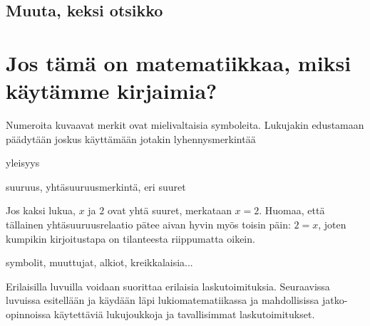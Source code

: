 \subsection*{Muuta, keksi otsikko}





\section{Jos tämä on matematiikkaa, miksi käytämme kirjaimia?}

Numeroita kuvaavat merkit ovat mielivaltaisia symboleita. Lukujakin edustamaan päädytään joskus käyttämään jotakin lyhennysmerkintää

yleisyys

suuruus, yhtäsuuruusmerkintä, eri suuret

Jos kaksi lukua, $x$ ja $2$ ovat yhtä suuret, merkataan
$x=2$. Huomaa, että tällainen yhtäsuuruusrelaatio pätee aivan hyvin myös toisin päin: $2=x$, joten kumpikin kirjoitustapa on tilanteesta riippumatta oikein.

symbolit, muuttujat, alkiot, kreikkalaisia...



Erilaisilla luvuilla voidaan suorittaa erilaisia laskutoimituksia. Seuraavissa luvuissa esitellään ja käydään läpi lukiomatematiikassa ja mahdollisissa jatko-opinnoissa käytettäviä lukujoukkoja ja tavallisimmat laskutoimitukset.
